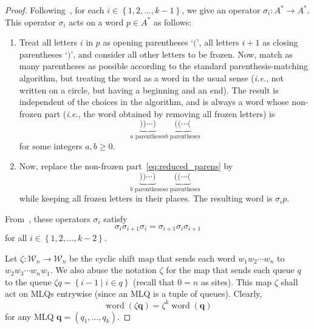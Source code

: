 \documentclass[reqno]{amsart}
\newcommand{\0}{\phantom{c}}
\DeclareMathOperator{\word}{word} %
\newcommand{\qq}{\mathbf{q}}
\newcommand{\mcW}{\mathcal{W}}
\newcommand{\set}[1]{\left\{ #1 \right\}}
\newcommand{\tup}[1]{\left( #1 \right)}
\theoremstyle{plain}
\theoremstyle{definition}
\numberwithin{equation}{section}
\begin{document}
\begin{proof}
Following~\cite[\S5.5]{Loth}, for each $i \in \set{1, 2, \ldots, k-1}$, we give an operator
$\sigma_i \colon A^* \to A^*$.
This operator $\sigma_i$ acts on a word $p \in A^*$ %
as follows:
\begin{enumerate}
 \item Treat all letters $i$ in $p$ as opening parentheses `$($',
       all letters $i+1$ as closing parentheses `$)$',
       and consider all other letters to be frozen.
       Now, match as many parentheses as possible
       according to the standard parenthesis-matching algorithm,
       but treating the word as a word in the usual sense
       (\textit{i.e.}, not written on a circle, but having a beginning
       and an end).
       The result is independent of the choices in the algorithm,
       and is always a word whose non-frozen
       part (\textit{i.e.}, the word obtained by removing
       all frozen letters) is
       \begin{equation}
       \label{eq:reduced_parens}
       \underbrace{))\cdots)}_{a\text{ parentheses}}
       \underbrace{((\cdots(}_{b\text{ parentheses}}
       \end{equation}
       for some integers $a, b \geq 0$.
 \item Now, replace the non-frozen part~\eqref{eq:reduced_parens} by
       \[
       \underbrace{))\cdots)}_{b\text{ parentheses}}
       \underbrace{((\cdots(}_{a\text{ parentheses}}
       \]
       while keeping all frozen letters in their places.
       The resulting word is $\sigma_i p$.
\end{enumerate}
From~\cite[Eq.~(5.6.3)]{Loth}, these operators
$\sigma_i$ satisfy
\begin{equation}
 \sigma_i \sigma_{i+1} \sigma_i
 = \sigma_{i+1} \sigma_i \sigma_{i+1}
 \label{pf.prop:braid.loth-eq}
\end{equation}
for all $i \in \set{1, 2, \ldots, k-2}$.

Let $\zeta \colon \mcW_n \to \mcW_n$ be the cyclic shift map that sends each word $w_1 w_2 \cdots w_n$ to $w_2 w_3 \cdots w_n w_1$.
We also abuse the notation $\zeta$ for the map that sends each queue $q$ to the queue $\zeta q = \set{ i - 1 \mid i \in q }$ (recall that $0 = n$ as sites).
This map $\zeta$ shall act on MLQs entrywise (since an MLQ is a tuple of queues).
Clearly,
\begin{equation}
 \word(\zeta \qq) = \zeta^k \word(\qq)
 \label{pf.prop:braid.word-zeta}
\end{equation}
for any MLQ $\qq = (q_1, \ldots, q_k)$.


\end{proof}
\end{document}
